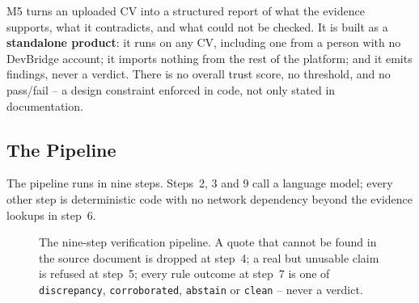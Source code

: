\documentclass[11pt,a4paper]{article}
\begin{document}
M5 turns an uploaded CV into a structured report of what the evidence
supports, what it contradicts, and what could not be checked. It is built as
a \textbf{standalone product}: it runs on any CV, including one from a person
with no DevBridge account; it imports nothing from the rest of the platform;
and it emits findings, never a verdict. There is no overall trust score, no
threshold, and no pass/fail -- a design constraint enforced in code, not only
stated in documentation.

\subsection{The Pipeline}

The pipeline runs in nine steps. Steps~2, 3 and 9 call a language model;
every other step is deterministic code with no network dependency beyond the
evidence lookups in step~6.

\begin{figure}[H]
\centering
{}
\caption{The nine-step verification pipeline. A quote that cannot be found
in the source document is dropped at step~4; a real but unusable claim is
refused at step~5; every rule outcome at step~7 is one of
\texttt{discrepancy}, \texttt{corroborated}, \texttt{abstain} or
\texttt{clean} -- never a verdict.}
\end{figure}
\end{document}
